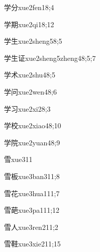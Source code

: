 \begin{verbete}{学分}{xue2fen1}{8;4}
\end{verbete}
\begin{verbete}{学期}{xue2qi1}{8;12}
\end{verbete}
\begin{verbete}{学生}{xue2sheng5}{8;5}
\end{verbete}
\begin{verbete}{学生证}{xue2sheng5zheng4}{8;5;7}
\end{verbete}
\begin{verbete}{学术}{xue2shu4}{8;5}
\end{verbete}
\begin{verbete}{学问}{xue2wen4}{8;6}
\end{verbete}
\begin{verbete}{学习}{xue2xi2}{8;3}
\end{verbete}
\begin{verbete}{学校}{xue2xiao4}{8;10}
\end{verbete}
\begin{verbete}{学院}{xue2yuan4}{8;9}
\end{verbete}
\begin{verbete}{雪}{xue3}{11}
\end{verbete}
\begin{verbete}{雪板}{xue3ban3}{11;8}
\end{verbete}
\begin{verbete}{雪花}{xue3hua1}{11;7}
\end{verbete}
\begin{verbete}{雪葩}{xue3pa1}{11;12}
\end{verbete}
\begin{verbete}{雪人}{xue3ren2}{11;2}
\end{verbete}
\begin{verbete}{雪鞋}{xue3xie2}{11;15}
\end{verbete}


